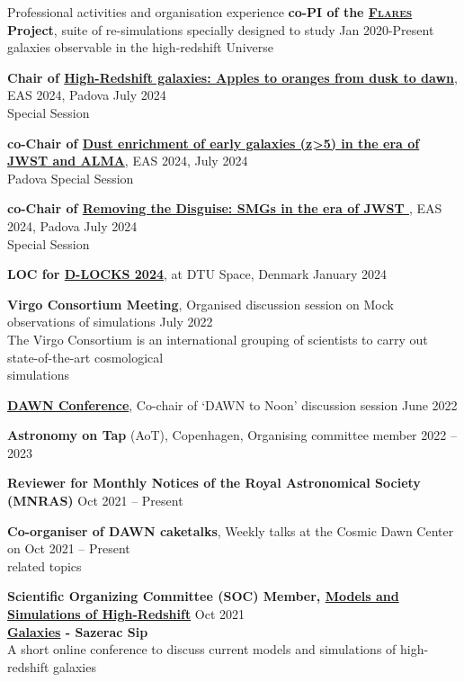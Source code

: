 \documentclass[a4paper,10pt]{resume} %
\begin{document}
\begin{rSection}{Professional activities and organisation experience}
	{\textbf{co-PI of the \href{https://flaresimulations.github.io/}{\textsc{Flares}} Project}, suite of re-simulations specially designed to study } \hfill {Jan 2020-Present}\\
	galaxies observable in the high-redshift Universe
	
	{\textbf{Chair of \href{https://eas.unige.ch/EAS2024/session.jsp?id=SS29}{High-Redshift galaxies: Apples to oranges from dusk to dawn}}, EAS 2024, Padova} \hfill July 2024\\
	Special Session

	{\textbf{co-Chair of \href{https://eas.unige.ch/EAS2024/session.jsp?id=SS9}{Dust enrichment of early galaxies (z>5) in the era of JWST and ALMA}}, EAS 2024,} \hfill July 2024\\
	Padova Special Session

	{\textbf{co-Chair of \href{https://eas.unige.ch/EAS2024/session.jsp?id=SS12}{Removing the Disguise: SMGs in the era of JWST
	}}, EAS 2024, Padova} \hfill July 2024\\
	Special Session
	
	{\textbf{LOC for \href{https://d-locks.github.io/}{D-LOCKS 2024}}, at DTU Space, Denmark} \hfill January 2024
	
	{\textbf{Virgo Consortium Meeting}, Organised discussion session on Mock observations of simulations} \hfill {July 2022}
	\\
	The Virgo Consortium is an international grouping of scientists to carry out state-of-the-art cosmological \\simulations 
	
	{\textbf{\href{https://cosmicdawn.dk/event/copenhagen-dawn-conference-2022/}{DAWN Conference}}, Co-chair of `DAWN to Noon' discussion session} \hfill {June 2022}
	
	{\textbf{Astronomy on Tap} (AoT), Copenhagen, Organising committee member} \hfill {2022 -- 2023}
	
	{\textbf{Reviewer for Monthly Notices of the Royal Astronomical Society (MNRAS)}} \hfill {Oct 2021 -- Present}
	
	{\textbf{Co-organiser of DAWN caketalks}, Weekly talks at the Cosmic Dawn Center on} \hfill {Oct 2021 -- Present}
	\\
	related topics
	
	{\textbf{Scientific Organizing Committee (SOC) Member, \href{http://sazerac-conference.org/SIPS2122/1.html}{Models and Simulations of High-Redshift}}} \hfill {Oct 2021}\\
	\textbf{\href{http://sazerac-conference.org/SIPS2122/1.html}{Galaxies} - Sazerac Sip}
	\\
	{A short online conference to discuss current models and simulations of high-redshift galaxies}
	

\end{rSection}
\end{document}
